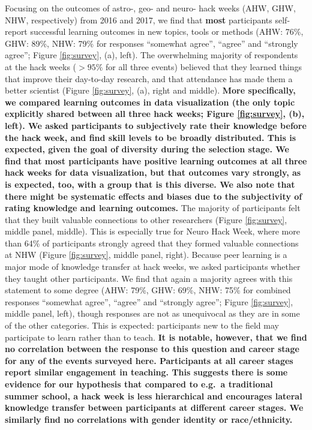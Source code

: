 Focusing on the outcomes of astro-, geo- and neuro- hack weeks (AHW, GHW, NHW, respectively) from 2016 and 2017, we find that \textbf{most} participants self-report successful learning outcomes in new topics, tools or methods (AHW: 76\%, GHW: 89\%, NHW: 79\% for responses ``somewhat agree'', ``agree'' and ``strongly agree''; Figure \ref{fig:survey}, (a), left).
The overwhelming majority of respondents at the hack weeks ($>95\%$ for all three events) believed that they learned things that improve their day-to-day research, and that attendance has made them a better scientist (Figure \ref{fig:survey}, (a), right and middle).
\textbf{More specifically, we compared learning outcomes in data visualization (the only topic explicitly shared between all three hack weeks; Figure \ref{fig:survey}, (b), left). We asked participants to subjectively rate their knowledge before the hack week, and find skill levels to be broadly distributed. This is expected, given the goal of diversity during the selection stage. We find that most participants have positive learning outcomes at all three hack weeks for data visualization, but that outcomes vary strongly, as is expected, too, with a group that is this diverse. We also note that there might be systematic effects and biases due to the subjectivity of rating knowledge and learning outcomes.}
The majority of participants felt that they built valuable connections to other researchers (Figure \ref{fig:survey}, middle panel, middle).
This is especially true for Neuro Hack Week, where more than 64\% of participants strongly agreed that they formed valuable connections at NHW (Figure  \ref{fig:survey}, middle panel, right).
Because peer learning is a major mode of knowledge transfer at hack weeks, we asked participants whether they taught other participants.
We find that again a majority agrees with this statement to some degree (AHW: 79\%, GHW: 69\%, NHW: 75\% for combined responses ``somewhat agree'', ``agree'' and ``strongly agree''; Figure \ref{fig:survey}, middle panel, left), though responses are not as unequivocal as they are in some of the other categories.
This is expected: participants new to the field may participate to learn rather than to teach. \textbf{It is notable, however, that we find no correlation between the response to this question and career stage for any of the events surveyed here. Participants at all career stages report similar engagement in teaching. This suggests there is some evidence for our hypothesis that compared to e.g.\ a traditional summer school, a hack week is less hierarchical and encourages lateral knowledge transfer between participants at different career stages.  We similarly find no correlations with gender identity or race/ethnicity.}

